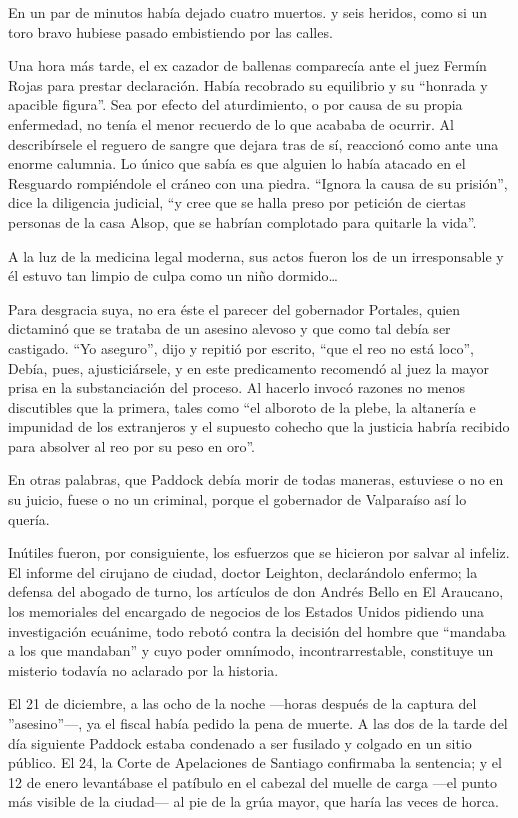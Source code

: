 \documentclass[10pt,twoside,openright]{memoir}
\begin{document}
En un par de minutos había dejado cuatro muertos. y seis heridos, como
si un toro bravo hubiese pasado embistiendo por las calles.

Una
hora más tarde, el ex cazador de ballenas comparecía ante el juez Fermín
Rojas para prestar declaración. Había recobrado su equilibrio y su
``honrada y apacible figura''. Sea por efecto del aturdimiento, o por
causa de su propia enfermedad, no tenía el menor recuerdo de lo que
acababa de ocurrir. Al describírsele el reguero de sangre que dejara
tras de sí, reaccionó como ante una enorme calumnia. Lo
único que sabía es que alguien lo
había atacado en el Resguardo rompiéndole el cráneo con una piedra.
``Ignora la causa de su prisión'', dice la diligencia judicial, ``y cree
que se halla preso por petición de ciertas personas de la casa Alsop,
que se habrían complotado para quitarle la vida''.

A la luz de la medicina legal moderna, sus actos fueron los de un
irresponsable y él estuvo tan limpio de culpa como un niño
dormido\ldots{}

Para desgracia suya, no era éste el parecer del gobernador Portales,
quien dictaminó que se trataba de un asesino alevoso y que como tal
debía ser castigado. ``Yo aseguro'', dijo y repitió por escrito, ``que el
reo no está loco'', Debía, pues, ajusticiársele, y en este predicamento
recomendó al juez la mayor prisa en la substanciación del proceso. Al
hacerlo invocó razones no menos
discutibles que la primera, tales como ``el alboroto de la plebe, la
altanería e impunidad de los extranjeros y el supuesto cohecho que la
justicia habría recibido para absolver al reo por su peso en oro''.

En otras palabras, que Paddock debía morir de todas maneras, estuviese o
no en su juicio, fuese o no un criminal, porque el gobernador de
Valparaíso así lo quería.

Inútiles fueron, por consiguiente, los esfuerzos que se hicieron por
salvar al infeliz. El informe del cirujano de ciudad, doctor Leighton,
declarándolo enfermo; la defensa del abogado de turno, los artículos de
don Andrés Bello en El Araucano, los memoriales del encargado de
negocios de los Estados Unidos pidiendo una investigación ecuánime, todo
rebotó contra la decisión del hombre que ``mandaba
a los que mandaban'' y cuyo poder
omnímodo, incontrarrestable, constituye un misterio todavía no aclarado
por la historia.

El 21 de diciembre, a las ocho de la noche ---horas después de la
captura del ''asesino''---, ya el fiscal había pedido la pena de muerte.
A las dos de la tarde del día siguiente Paddock estaba condenado a ser
fusilado y colgado en un sitio público. El 24, la
Corte de Apelaciones de Santiago
confirmaba la sentencia; y el 12 de enero levantábase el patíbulo en el
cabezal del muelle de carga ---el punto más visible de la ciudad--- al
pie de la grúa mayor, que haría las veces de horca.
\end{document}
